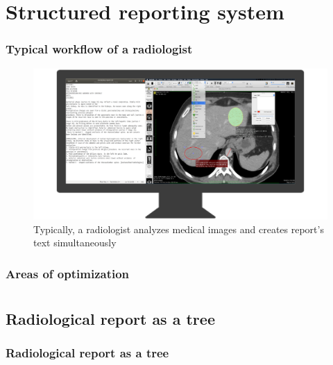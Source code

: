 \documentclass{beamer}
\begin{document}
\section{Structured reporting system}
\begin{frame}
\frametitle{Typical workflow of a radiologist}
\begin{figure}
	\centering
	\includegraphics[width=1\linewidth]{../workspace}
	\caption{Typically, a radiologist analyzes medical images and creates report's text simultaneously}
	\label{fig:workspace}
\end{figure}
\end{frame}

\begin{frame}
\frametitle{Areas of optimization}
\end{frame}



\section{}
\subsection{Radiological report as a tree}
\begin{frame}
\frametitle{Radiological report as a tree}

\end{frame}
\end{document}
